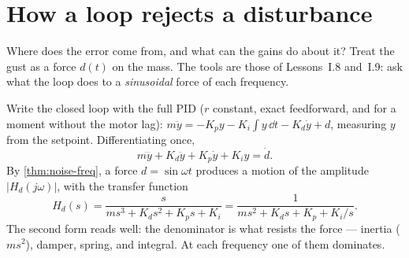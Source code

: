 
\section{How a loop rejects a disturbance}

Where does the error come from, and what can the gains do about it? Treat the gust as a force $d(t)$ on the mass. The tools are those of Lessons~I.8 and~I.9: ask what the loop does to a \emph{sinusoidal} force of each frequency.

Write the closed loop with the full PID ($r$ constant, exact feedforward, and for a moment without the motor lag): $m\ddot y = -K_p y - K_i\!\int\! y\,\dd t - K_d\dot y + d$, measuring $y$ from the setpoint. Differentiating once,
\begin{equation}
  m\dddot y + K_d\ddot y + K_p\dot y + K_i y = \dot d .
\end{equation}
By \cref{thm:noise-freq}, a force $d = \sin\omega t$ produces a motion of the amplitude $|H_d(j\omega)|$, with the transfer function
\begin{equation}\label{eq:challenge-sens}
  H_d(s) = \frac{s}{m s^3 + K_d s^2 + K_p s + K_i} = \frac{1}{m s^2 + K_d s + K_p + K_i/s} .
\end{equation}
The second form reads well: the denominator is what resists the force — inertia ($ms^2$), damper, spring, and integral. At each frequency one of them dominates.


